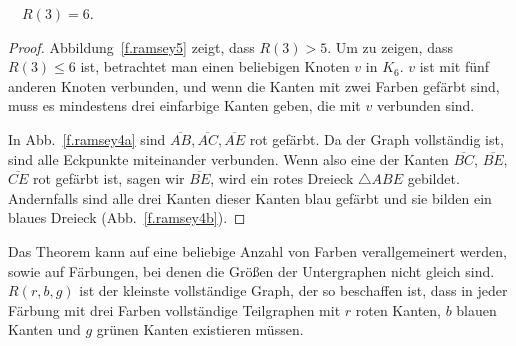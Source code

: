 \begin{theorem}[Ramsey]
$\quad R(3)=6$.\label{thm.ramsey}
\end{theorem}

\begin{proof}

Abbildung~\ref{f.ramsey5} zeigt, dass $R(3)>5$. Um zu zeigen, dass $R(3)\leq 6$ ist, betrachtet man einen beliebigen Knoten $v$ in $K_6$. $v$ ist mit fünf anderen Knoten verbunden, und wenn die Kanten mit zwei Farben gefärbt sind, muss es mindestens drei einfarbige Kanten geben, die mit $v$ verbunden sind. 

In Abb.~\ref{f.ramsey4a} sind $\overline{AB}, \overline{AC}, \overline{AE}$ rot gefärbt. Da der Graph vollständig ist, sind alle Eckpunkte miteinander verbunden. Wenn also eine der Kanten $\overline{BC}$, $\overline{BE}$, $\overline{CE}$ rot gefärbt ist, sagen wir $\overline{BE}$, wird ein rotes Dreieck $\triangle ABE$ gebildet. Andernfalls sind alle drei Kanten dieser Kanten blau gefärbt und sie bilden ein blaues Dreieck (Abb.~\ref{f.ramsey4b}).
\end{proof}

Das Theorem kann auf eine beliebige Anzahl von Farben verallgemeinert werden, sowie auf Färbungen, bei denen die Größen der Untergraphen nicht gleich sind. $R(r,b,g)$ ist der kleinste vollständige Graph, der so beschaffen ist, dass in jeder Färbung mit drei Farben vollständige Teilgraphen mit $r$ roten Kanten, $b$ blauen Kanten und $g$ grünen Kanten existieren müssen.

